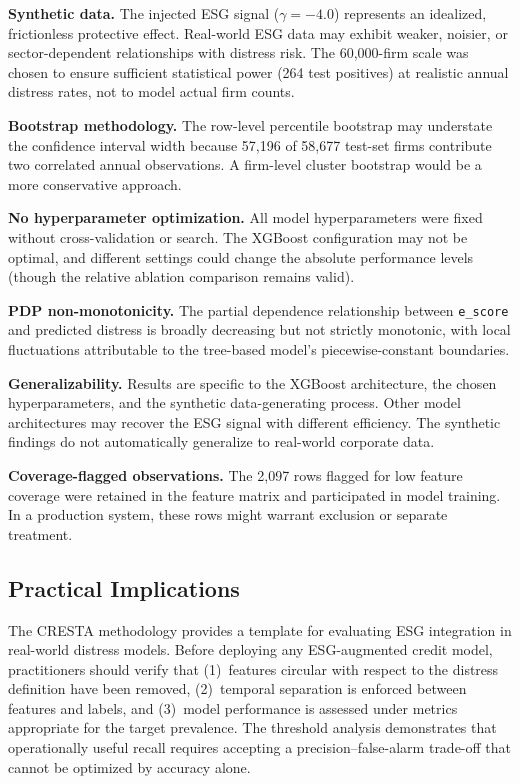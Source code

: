 \documentclass[sigconf,anonymous]{acmart}
\begin{document}
\textbf{Synthetic data.} The injected ESG signal ($\gamma = -4.0$) represents an idealized, frictionless protective effect. Real-world ESG data may exhibit weaker, noisier, or sector-dependent relationships with distress risk. The 60,000-firm scale was chosen to ensure sufficient statistical power (264 test positives) at realistic annual distress rates, not to model actual firm counts.

\textbf{Bootstrap methodology.} The row-level percentile bootstrap may understate the confidence interval width because 57,196 of 58,677 test-set firms contribute two correlated annual observations. A firm-level cluster bootstrap would be a more conservative approach.

\textbf{No hyperparameter optimization.} All model hyperparameters were fixed without cross-validation or search. The XGBoost configuration may not be optimal, and different settings could change the absolute performance levels (though the relative ablation comparison remains valid).

\textbf{PDP non-monotonicity.} The partial dependence relationship between \texttt{e\_score} and predicted distress is broadly decreasing but not strictly monotonic, with local fluctuations attributable to the tree-based model's piecewise-constant boundaries.

\textbf{Generalizability.} Results are specific to the XGBoost architecture, the chosen hyperparameters, and the synthetic data-generating process. Other model architectures may recover the ESG signal with different efficiency. The synthetic findings do not automatically generalize to real-world corporate data.

\textbf{Coverage-flagged observations.} The 2,097 rows flagged for low feature coverage were retained in the feature matrix and participated in model training. In a production system, these rows might warrant exclusion or separate treatment.

\subsection{Practical Implications}
The CRESTA methodology provides a template for evaluating ESG integration in real-world distress models. Before deploying any ESG-augmented credit model, practitioners should verify that (1)~features circular with respect to the distress definition have been removed, (2)~temporal separation is enforced between features and labels, and (3)~model performance is assessed under metrics appropriate for the target prevalence. The threshold analysis demonstrates that operationally useful recall requires accepting a precision--false-alarm trade-off that cannot be optimized by accuracy alone.
\end{document}
